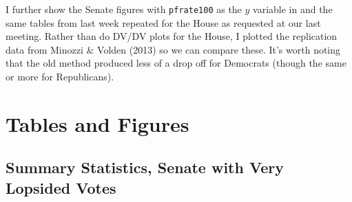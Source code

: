 \documentclass[12pt]{article}
\begin{document}
I further show the Senate figures with \verb|pfrate100| as the $y$ variable in and the same tables from last week repeated for the House as requested at our last meeting. Rather than do DV/DV plots for the House, I plotted the replication data from Minozzi \& Volden (2013) so we can compare these. It's worth noting that the old method produced less of a drop off for Democrats (though the same or more for Republicans).

\pagebreak



\section{Tables and Figures}

\subsection{Summary Statistics, Senate with Very Lopsided Votes}
\end{document}
